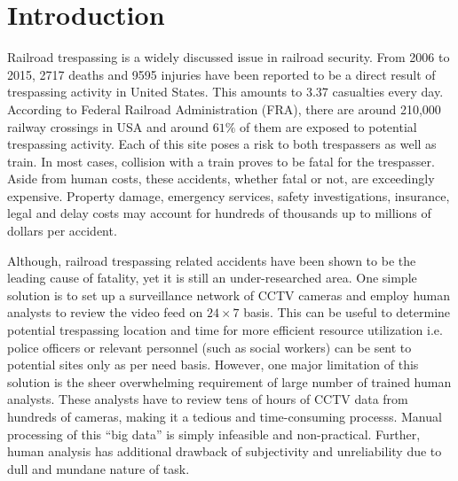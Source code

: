 \section{Introduction}
Railroad trespassing is a widely discussed issue in railroad security. From 2006 to 2015, 2717 deaths and 9595 injuries have been reported to be a direct result of trespassing activity in United States\cite{zhang2018automated}. This amounts to 3.37 casualties every day. According to Federal Railroad Administration (FRA), there are around 210,000 railway crossings in USA and around $61\%$ of them are exposed to potential trespassing activity\cite{zhang2018automated}. Each of this site poses a risk to both trespassers as well as train. In most cases, collision with a train proves to be fatal for the trespasser. Aside from human costs, these accidents, whether fatal or not, are exceedingly expensive. Property damage, emergency services, safety investigations, insurance, legal and delay costs may account for hundreds of thousands up to millions of dollars per accident\cite{goldberg1998train}. 

Although, railroad trespassing related accidents have been shown to be the leading cause of fatality\cite{pelletier1997deaths,matzopoulos1998hours,lobb2003evaluation,evans2003accidental}, yet it is still an under-researched area\cite{lobb2006trespassing}. One simple solution is to set up a surveillance network of CCTV cameras and employ human analysts to review the video feed on $24 \times 7$
basis. This can be useful to determine potential trespassing location and time for more efficient resource utilization i.e. police officers or relevant personnel (such as social workers) can be sent to potential sites only as per need basis. However, one major limitation of this solution is the sheer overwhelming requirement of large number of trained human analysts. These analysts have to review tens of hours of CCTV data from hundreds of cameras, making it a tedious and time-consuming processs. Manual processing of this ``big data'' is simply infeasible and non-practical. Further, human analysis has additional drawback of subjectivity and unreliability due to dull and mundane nature of task\cite{norouznezhad2008high}.

